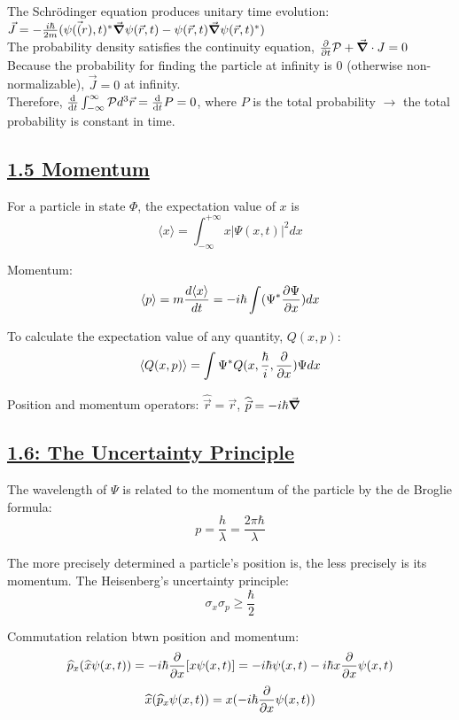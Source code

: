 The Schr\"odinger equation produces unitary time evolution: \\
$\vec{J} = - \frac{i \hbar}{2m} (\psi(\vec(r), t)^* \vec{\grad} \psi(\vec{r}, t) - \psi(\vec{r}, t) \vec{\grad} \psi(\vec{r}, t)^*)$ \\
The probability density satisfies the continuity equation, $\pdv{}{t} \mathcal{P} + \vec{\grad} \cdot J = 0$ \\
Because the probability for finding the particle at infinity is 0 (otherwise non-normalizable), $\vec{J} = 0$ at infinity. \\
Therefore, $\dv{}{t} \int_{-\infty}^{\infty} \mathcal{P} d^3 \vec{r} = \dv{}{t} P = 0$, where $P$ is the total probability $\rightarrow$
the total probability is constant in time.

\subsection{\underline{1.5 Momentum}}
For a particle in state $\Phi$, the expectation value of $x$ is
    $$\langle x \rangle = \int_{-\infty}^{+\infty} x |\Psi(x, t)|^2 dx$$

Momentum:
    $$\langle p \rangle = m \frac{d \langle x \rangle}{dt} = -i \hbar \int (\Psi^* \pdv{\Psi}{x}) dx$$

To calculate the expectation value of any quantity, $Q(x, p)$:
$$\langle Q(x, p) \rangle = \int \Psi^* Q(x, \frac{\hbar}{i}, \pdv{}{x}) \Psi dx$$

Position and momentum operators: $\widehat{\vec{r}} = \vec{r}$, $\widehat{\vec{p}} = -i \hbar \vec{\grad}$

\subsection{\underline{1.6: The Uncertainty Principle}}
The wavelength of $\Psi$ is related to the momentum of the particle by the de Broglie formula:
    $$p = \frac{h}{\lambda} = \frac{2 \pi \hbar}{\lambda}$$

The more precisely determined a particle's position is, the less precisely is its momentum. The Heisenberg's uncertainty principle:
    $$\sigma_x \sigma_p \geq \frac{\hbar}{2}$$

Commutation relation btwn position and momentum:
$$\widehat{p}_x (\widehat{x} \psi(x, t)) = -i \hbar \pdv{}{x} [x \psi(x, t)] = -i \hbar \psi(x, t) - i \hbar x \pdv{}{x} \psi(x, t)$$
    $$\widehat{x} (\widehat{p}_x \psi(x, t)) = x (-i \hbar \pdv{}{x} \psi(x, t))$$

